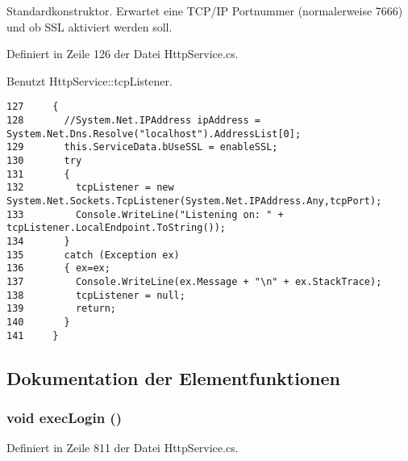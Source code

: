 Standardkonstruktor. Erwartet eine TCP/IP Portnummer (normalerweise 7666) und ob SSL aktiviert werden soll. 



Definiert in Zeile 126 der Datei Http\-Service.cs.

Benutzt Http\-Service::tcp\-Listener.



\footnotesize\begin{verbatim}127     {
128       //System.Net.IPAddress ipAddress = System.Net.Dns.Resolve("localhost").AddressList[0];
129       this.ServiceData.bUseSSL = enableSSL;
130       try
131       {
132         tcpListener = new System.Net.Sockets.TcpListener(System.Net.IPAddress.Any,tcpPort);
133         Console.WriteLine("Listening on: " + tcpListener.LocalEndpoint.ToString());
134       }
135       catch (Exception ex)
136       { ex=ex;
137         Console.WriteLine(ex.Message + "\n" + ex.StackTrace);
138         tcpListener = null;
139         return;
140       }
141     }
\end{verbatim}\normalsize 


\subsection{Dokumentation der Elementfunktionen}
\hypertarget{classQbeSAS_1_1HttpService_QbeSAS_1_1HttpServiced10}{
\subsubsection[execLogin]{\setlength{\rightskip}{0pt plus 5cm}void exec\-Login ()}}
\label{classQbeSAS_1_1HttpService_QbeSAS_1_1HttpServiced10}




Definiert in Zeile 811 der Datei Http\-Service.cs.



